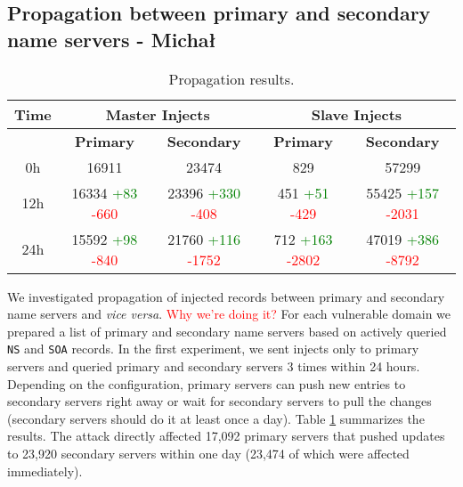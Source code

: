\subsection{Propagation between primary and secondary name servers - Michał}
\begin{table}[h!]
\begin{center}
\caption{Propagation results. \label{tab:propagation}}
\begin{tabular}{| c | c | c | c | c|} 
\hline
\textbf{Time} & \multicolumn{2}{|c|}{\textbf{Master Injects}} & \multicolumn{2}{|c|}{\textbf{Slave Injects}} \\
\hline
& \textbf{Primary} & \textbf{Secondary} & \textbf{Primary} & \textbf{Secondary}\\ 
\hline
0h & 16911 & 23474 & 829 & 57299\\ 
\hline 
12h & 16334 \textcolor{green}{+83} \textcolor{red}{-660}& 23396 \textcolor{green}{+330} \textcolor{red}{-408}& 451 \textcolor{green}{+51} \textcolor{red}{-429}& 55425 \textcolor{green}{+157} \textcolor{red}{-2031} \\ 
\hline 
24h & 15592 \textcolor{green}{+98} \textcolor{red}{-840} & 21760 \textcolor{green}{+116} \textcolor{red}{-1752} & 712 \textcolor{green}{+163} \textcolor{red}{-2802} & 47019 \textcolor{green}{+386} \textcolor{red}{-8792} \\ 
\hline 
\end{tabular}
\end{center}
\end{table}
We investigated propagation of injected records between primary and secondary name servers and \textit{vice versa}. \textcolor{red}{Why we're doing it?}
For each vulnerable domain we prepared a list of primary and secondary name servers based on actively queried \texttt{NS} and \texttt{SOA} records. 
In the first experiment, we sent injects only to primary servers and queried primary and secondary servers 3 times within 24 hours. 
Depending on the configuration, primary servers can push new entries to secondary servers right away or wait for secondary servers to pull the changes (secondary servers should do it at least once a day). 
Table \ref{tab:propagation} summarizes the results.
The attack directly affected 17,092 primary servers that pushed updates to 23,920 secondary servers within one day (23,474 of which were affected immediately). 

